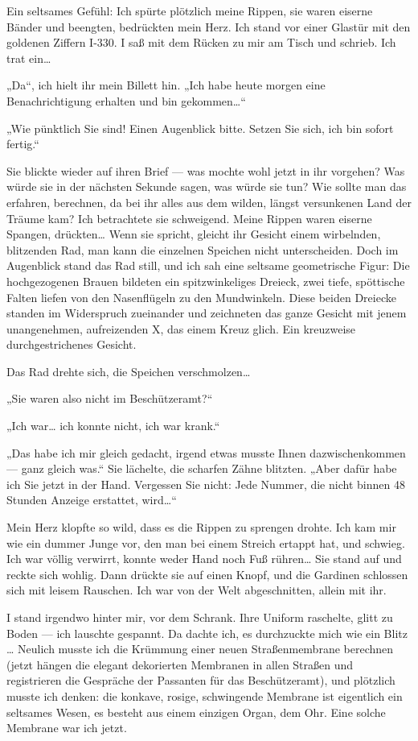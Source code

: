 Ein seltsames Gefühl: Ich spürte plötzlich meine Rippen, sie waren
eiserne Bänder und beengten, bedrückten mein Herz. Ich stand vor
einer Glastür mit den goldenen Ziffern I-330. I saß mit dem Rücken
zu mir am Tisch und schrieb. Ich trat ein\ldots{}

„Da“, ich hielt ihr mein Billett hin. „Ich habe heute morgen eine
Benachrichtigung erhalten und bin gekommen\ldots{}“

„Wie pünktlich Sie sind! Einen Augenblick bitte. Setzen Sie sich,
ich bin sofort fertig.“

Sie blickte wieder auf ihren Brief — was mochte wohl jetzt in ihr
vorgehen? Was würde sie in der nächsten Sekunde sagen, was würde
sie tun? Wie sollte man das erfahren, berechnen, da bei ihr alles
aus dem wilden, längst versunkenen Land der Träume kam? Ich
betrachtete sie schweigend. Meine Rippen waren eiserne Spangen,
drückten\ldots{} Wenn sie spricht, gleicht ihr Gesicht einem wirbelnden,
blitzenden Rad, man kann die einzelnen Speichen nicht
unterscheiden. Doch im Augenblick stand das Rad still, und ich sah
eine seltsame geometrische Figur: Die hochgezogenen Brauen bildeten
ein spitzwinkeliges Dreieck, zwei tiefe, spöttische Falten liefen
von den Nasenflügeln zu den Mundwinkeln. Diese beiden Dreiecke
standen im Widerspruch zueinander und zeichneten das ganze Gesicht
mit jenem unangenehmen, aufreizenden X, das einem Kreuz glich. Ein
kreuzweise durchgestrichenes Gesicht.

Das Rad drehte sich, die Speichen verschmolzen\ldots{}

„Sie waren also nicht im Beschützeramt?“

„Ich war\ldots{} ich konnte nicht, ich war krank.“

„Das habe ich mir gleich gedacht, irgend etwas musste Ihnen
dazwischenkommen — ganz gleich was.“ Sie lächelte, die scharfen
Zähne blitzten. „Aber dafür habe ich Sie jetzt in der Hand.
Vergessen Sie nicht: Jede Nummer, die nicht binnen 48 Stunden
Anzeige erstattet, wird\ldots{}“

Mein Herz klopfte so wild, dass es die Rippen zu sprengen drohte.
Ich kam mir wie ein dummer Junge vor, den man bei einem Streich
ertappt hat, und schwieg. Ich war völlig verwirrt, konnte weder
Hand noch Fuß rühren\ldots{} Sie stand auf und reckte sich wohlig. Dann
drückte sie auf einen Knopf, und die Gardinen schlossen sich mit
leisem Rauschen. Ich war von der Welt abgeschnitten, allein mit
ihr.

I stand irgendwo hinter mir, vor dem Schrank. Ihre Uniform
raschelte, glitt zu Boden — ich lauschte gespannt. Da dachte ich,
es durchzuckte mich wie ein Blitz \ldots{}
%
Neulich musste ich die
Krümmung einer neuen Straßenmembrane berechnen (jetzt hängen die
elegant dekorierten Membranen in allen Straßen und registrieren die Gespräche der
Passanten für das Beschützeramt), und plötzlich musste ich denken:
die konkave, rosige, schwingende Membrane ist eigentlich ein
seltsames Wesen, es besteht aus einem einzigen Organ, dem Ohr. Eine
solche Membrane war ich jetzt.

